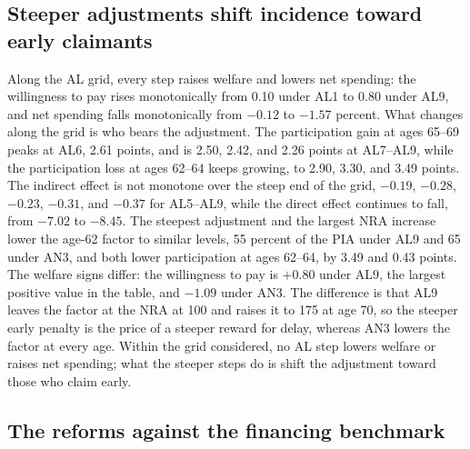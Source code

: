 \subsection{Steeper adjustments shift incidence toward early claimants}\label{subsec:incidence}

Along the AL grid, every step raises welfare and lowers net spending: the willingness to pay rises monotonically from 0.10 under AL1 to 0.80 under AL9, and net spending falls monotonically from $-0.12$ to $-1.57$ percent. %
What changes along the grid is who bears the adjustment. The participation gain at ages 65--69 peaks at AL6, 2.61 points, and is 2.50, 2.42, and 2.26 points at AL7--AL9, while the participation loss at ages 62--64 keeps growing, to 2.90, 3.30, and 3.49 points. %
The indirect effect is not monotone over the steep end of the grid, $-0.19$, $-0.28$, $-0.23$, $-0.31$, and $-0.37$ for AL5--AL9, while the direct effect continues to fall, from $-7.02$ to $-8.45$. %
The steepest adjustment and the largest NRA increase lower the age-62 factor to similar levels, 55 percent of the PIA under AL9 and 65 under AN3, and both lower participation at ages 62--64, by 3.49 and 0.43 points. %
The welfare signs differ: the willingness to pay is $+0.80$ under AL9, the largest positive value in the table, and $-1.09$ under AN3. %
The difference is that AL9 leaves the factor at the NRA at 100 and raises it to 175 at age 70, so the steeper early penalty is the price of a steeper reward for delay, whereas AN3 lowers the factor at every age. %
Within the grid considered, no AL step lowers welfare or raises net spending; what the steeper steps do is shift the adjustment toward those who claim early.

\subsection{The reforms against the financing benchmark}\label{subsec:benchmark}

